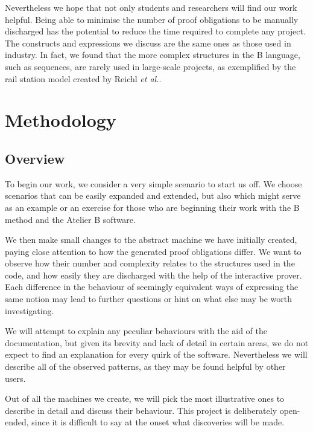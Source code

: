 \documentclass[11pt,journal]{IEEEtran}
\begin{document}
	Nevertheless we hope that not only students and researchers will find our work helpful. Being able to minimise the number of proof obligations to be manually discharged has the potential to reduce the time required to complete any project. The constructs and expressions we discuss are the same ones as those used in industry. In fact, we found that the more complex structures in the B language, such as sequences, are rarely used in large-scale projects, as exemplified by the rail station model created by Reichl \textit{et al.}\cite{station model}.


	\section{Methodology}
	\subsection{Overview}
	To begin our work, we consider a very simple scenario to start us off. We choose scenarios that can be easily expanded and extended, but also which might serve as an example or an exercise for those who are beginning their work with the B method and the Atelier B software.
	
	We then make small changes to the abstract machine we have initially created, paying close attention to how the generated proof obligations differ. We want to observe how their number and complexity relates to the structures used in the code, and how easily they are discharged with the help of the interactive prover. Each difference in the behaviour of seemingly equivalent ways of expressing the same notion may lead to further questions or hint on what else may be worth investigating.
	
	We will attempt to explain any peculiar behaviours with the aid of the documentation, but given its brevity and lack of detail in certain areas, we do not expect to find an explanation for every quirk of the software. Nevertheless we will describe all of the observed patterns, as they may be found helpful by other users.
	
	Out of all the machines we create, we will pick the most illustrative ones to describe in detail and discuss their behaviour. This project is deliberately open-ended, since it is difficult to say at the onset what discoveries will be made.
\end{document}
